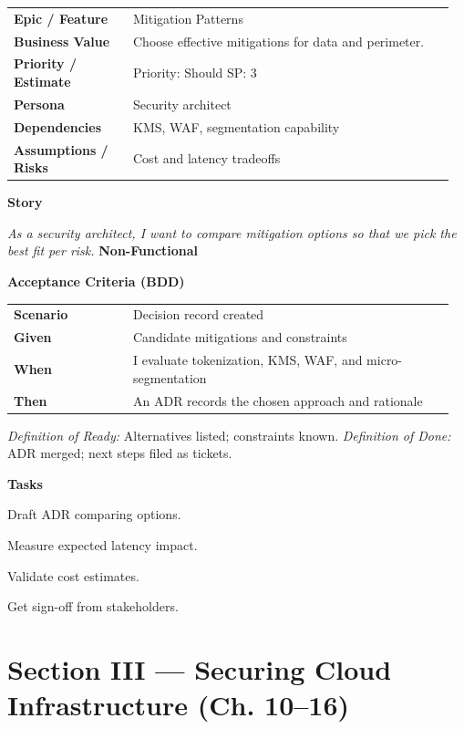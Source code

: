 \documentclass[11pt,letterpaper]{article}
\makeatletter
\newenvironment{kvtable}{%
  \begin{tabular}{@{}>{\bfseries\arraybackslash}p{0.26\linewidth} p{0.70\linewidth}@{}}
}{\end{tabular}}
\newenvironment{bdd}{%
  \begin{tabular}{@{}>{\bfseries\arraybackslash}p{0.26\linewidth} p{0.70\linewidth}@{}}
}{\end{tabular}}
\newcommand{\DoRDoD}[2]{%
  \vspace{0.35em}
  {\footnotesize\color{Muted}%
    \textit{Definition of Ready:} #1 \; \textbullet\;
    \textit{Definition of Done:} #2%
  }%
}
\newenvironment{storycard}[2]{%
  \begin{tcolorbox}[cloudcard, title={#1 --- #2}]%
}{\end{tcolorbox}}
\newcommand{\sectionlabel}[1]{\vspace{0.35em}\textbf{#1}\par}
\makeatother
\begin{document}
\begin{storycard}{CCS-9}{Ch. 9 — Risk Mitigation Methods}
\begin{kvtable}
Epic / Feature & Mitigation Patterns\\
Business Value & Choose effective mitigations for data and perimeter.\\
Priority / Estimate & Priority: Should \quad SP: 3\\
Persona & Security architect\\
Dependencies & KMS, WAF, segmentation capability\\
Assumptions / Risks & Cost and latency tradeoffs\\
\end{kvtable}
\sectionlabel{Story}
\textit{As a security architect, I want to compare mitigation options so that we pick the best fit per risk.}
\sectionlabel{Non-Functional}\;
\sectionlabel{Acceptance Criteria (BDD)}
\begin{bdd}
Scenario & Decision record created\\
Given & Candidate mitigations and constraints\\
When & I evaluate tokenization, KMS, WAF, and micro-segmentation\\
Then & An ADR records the chosen approach and rationale\\
\end{bdd}
\DoRDoD{Alternatives listed; constraints known.}{ADR merged; next steps filed as tickets.}
\sectionlabel{Tasks}
\begin{checklist}
\item Draft ADR comparing options.
\item Measure expected latency impact.
\item Validate cost estimates.
\item Get sign-off from stakeholders.
\end{checklist}
\end{storycard}

\section{Section III — Securing Cloud Infrastructure (Ch. 10--16)}
\end{document}
